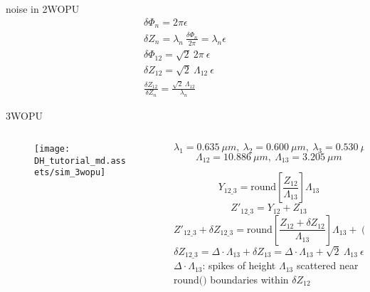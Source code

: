 \documentclass[t, aspectratio=169]{beamer}
\begin{document}
\begin{frame}{noise in 2WOPU}
	\begin{gather*}
\delta\Phi_n = 2\pi\epsilon \\
\delta Z_n = \lambda_n\ \frac{\delta\Phi_n}{2\pi} = \lambda_n\epsilon \\
\delta\Phi_{12} = \sqrt{2}\ 2\pi\ \epsilon \\
\delta Z_{12} = \sqrt{2}\ \Lambda_{12}\ \epsilon \\
\frac{\delta Z_{12}}{\delta Z_n} = \frac{\sqrt{2}\ \Lambda_{12}}{\lambda_n}
	\end{gather*}
\end{frame}


\begin{frame}{3WOPU}
	\begin{columns}
		\begin{column}{.4\textwidth}
			\vspace{-5 mm}
			\begin{figure}
				\texttt{[image: DH\_tutorial\_md.assets/sim\_3wopu]}
			\end{figure}
		\end{column}
		\begin{column}{.6\textwidth}
\vspace{-5 mm}
\begin{small}
\[ \lambda_1 = 0.635\ \mu m,\ \lambda_2=0.600\ \mu m,\ \lambda_3=0.530\ \mu m \]
\[ \Lambda_{12}=10.886\ \mu m,\ \Lambda_{13}=3.205\ \mu m \]
\end{small}
\pause
\[ Y_{12\_3} = \textrm{round}\left[\frac{Z_{12}}{\Lambda_{13}}\right]\Lambda_{13} \]
\[ Z'_{12\_3} = Y_{12} + Z_{13} \]
		\pause
\[ Z'_{12\_3} + \delta Z_{12\_3} = \textrm{round}\left[\frac{Z_{12} + \delta Z_{12}}{\Lambda_{13}} \right] \Lambda_{13} + (Z_{13} + \delta Z_{13}) \]
\[ \delta Z_{12\_3} = \Delta\cdot \Lambda_{13} + \delta Z_{13} = \Delta\cdot\Lambda_{13} + \sqrt{2}\ \Lambda_{13}\ \epsilon \] 
$\Delta\cdot\Lambda_{13}$: 		spikes of height $\Lambda_{13}$ scattered near $\textrm{round()}$ boundaries within $\delta Z_{12}$ 
		\end{column}
	\end{columns}
\end{frame}
\end{document}
